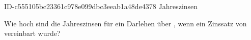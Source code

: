 \begin{exercise}
      {ID-c555105bc23361c978e099dbc3eeab1a48de4378}
      {Jahreszinsen}
  \ifproblem\problem\par
    Wie hoch sind die Jahreszinsen für ein Darlehen über , wenn
    ein Zinssatz von  vereinbart wurde?
  \fi
\end{exercise}
